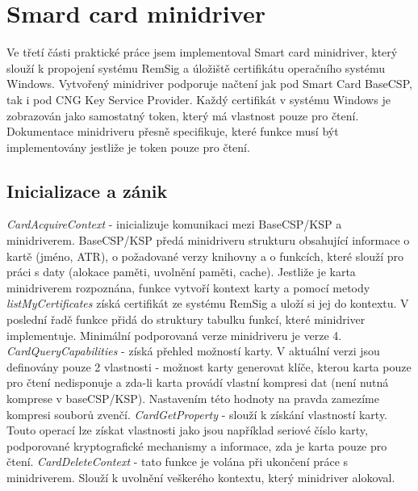 \documentclass[]{fithesis3}
\begin{document}
	\section{Smard card minidriver}
	Ve třetí části praktické práce jsem implementoval Smart card minidriver, který slouží k propojení 	systému RemSig a úložiště certifikátu operačního systému Windows. Vytvořený minidriver 			podporuje načtení jak pod Smart Card BaseCSP, tak i pod CNG Key Service Provider. Každý 		certifikát v systému Windows je zobrazován jako samostatný token, který má vlastnost pouze 		pro čtení. Dokumentace minidriveru přesně specifikuje, které funkce musí být implementovány 		jestliže je token pouze pro čtení.

		\subsection{Inicializace a zánik}
		\textit{CardAcquireContext} - inicializuje komunikaci mezi BaseCSP/KSP a minidriverem. 			BaseCSP/KSP předá minidriveru strukturu obsahující informace o kartě (jméno, ATR), o 				požadované verzy knihovny a o funkcích, které slouží pro práci s daty (alokace paměti, 			uvolnění paměti, cache). Jestliže je karta minidriverem rozpoznána, funkce vytvoří 				kontext karty a pomocí metody \textit{listMyCertificates} získá certifikát ze systému 				RemSig a uloží si jej do kontextu. V poslední řadě funkce přidá do struktury tabulku funkcí, 			které minidriver implementuje. Minimální podporovaná verze minidriveru je verze 4.
		\newline
 		\newline
		\textit{CardQueryCapabilities} - získá přehled možností karty. V aktuální verzi jsou 				definovány pouze 2 vlastnosti - možnost karty generovat klíče, kterou karta pouze pro 			čtení nedisponuje a zda-li karta provádí vlastní kompresi dat (není nutná komprese v 				baseCSP/KSP). Nastavením této hodnoty na pravda zamezíme kompresi souborů zvenčí.
		\newline
 		\newline
		\textit{CardGetProperty} - slouží k získání vlastností karty. Touto operací lze získat 				vlastnosti jako jsou například seriové číslo karty, podporované kryptografické mechanismy 			a informace, zda je karta pouze pro čtení.
		\newline
 		\newline
		\textit{CardDeleteContext} - tato funkce je volána při ukončení práce s minidriverem. 				Slouží k uvolnění veškerého kontextu, který minidriver alokoval.
\end{document}
